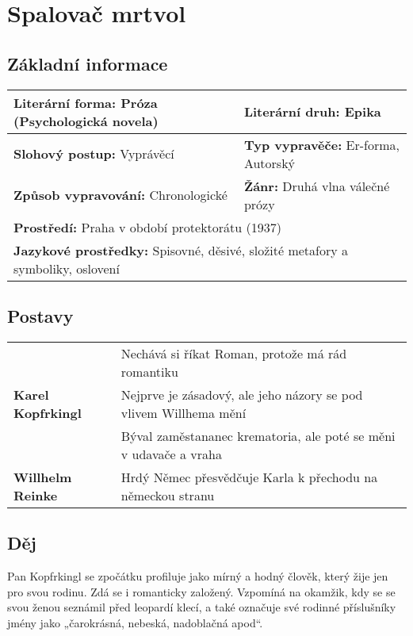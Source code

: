 \section{Spalovač mrtvol}
\label{sec:spalovacmrtvol}
\subsection*{Základní informace}
\begin{tabularx}{\linewidth}{l|l}
  \textbf{Literární forma:} Próza (Psychologická novela\footnotemark[1]) & \textbf{Literární druh:} Epika             \\
  \hline
  \textbf{Slohový postup:} Vyprávěcí                                     & \textbf{Typ vypravěče:} Er-forma, Autorský \\
  \hline
  \textbf{Způsob vypravování:} Chronologické                             & \textbf{Žánr:} Druhá vlna válečné prózy    \\
  \hline
  \multicolumn{2}{l}{\textbf{Prostředí:} Praha v období protektorátu (1937)}                                          \\
  \hline
  \multicolumn{2}{l}{\textbf{Jazykové prostředky:} Spisovné, děsivé, složité metafory a symboliky, oslovení}          \\
\end{tabularx}
\subsection*{Postavy}
\begin{tabularx}{\linewidth}{l|l}
  \multirow{3}{15em}{\textbf{Karel Kopfrkingl}} & Nechává si říkat Roman, protože má rád romantiku                  \\
                                                & Nejprve je zásadový, ale jeho názory se pod vlivem Willhema mění  \\
                                                & Býval zaměstananec krematoria, ale poté se měni v udavače a vraha \\
  \hline
  \textbf{Willhelm Reinke}                      & Hrdý Němec přesvědčuje Karla k přechodu na německou stranu        \\
\end{tabularx}
\subsection*{Děj}
Pan Kopfrkingl se zpočátku profiluje jako mírný a hodný člověk, který žije jen pro svou rodinu.
Zdá se i romanticky založený. Vzpomíná na okamžik, kdy se se svou ženou seznámil před leopardí klecí, a také označuje své rodinné příslušníky jmény jako „čarokrásná, nebeská, nadoblačná apod“.

